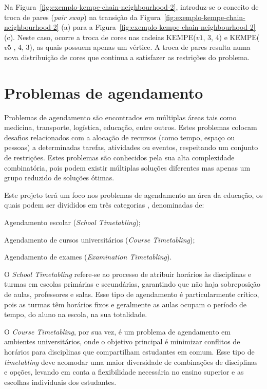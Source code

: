 Na Figura~\ref{fig:exemplo-kempe-chain-neighbourhood-2}, introduz-se o conceito de troca de pares (\textit{pair swap}) na transição da Figura~\ref{fig:exemplo-kempe-chain-neighbourhood-2} (a) para a Figura~\ref{fig:exemplo-kempe-chain-neighbourhood-2} (c). Neste caso, ocorre a troca de cores nas cadeias KEMPE($v1$, 3, 4) e KEMPE($v5$ , 4, 3), as quais possuem apenas um vértice. A troca de pares resulta numa nova distribuição de cores que continua a satisfazer as restrições do problema.

\section{Problemas de agendamento}
\label{capitulo2:Problemas-agendamento}

Problemas de agendamento são encontrados em múltiplas áreas tais como medicina, transporte, logística, educação, entre outros. Estes problemas colocam desafios relacionados com a alocação de recursos (como tempo, espaço ou pessoas) a determinadas tarefas, atividades ou eventos, respeitando um conjunto de restrições. Estes problemas são conhecidos pela sua alta complexidade combinatória, pois podem existir múltiplas soluções diferentes mas apenas um grupo reduzido de soluções ótimas.

Este projeto terá um foco nos problemas de agendamento na área da educação, os quais podem ser divididos em três categorias \cite{SurveyAutomatedTimetabling-Schaerf-1999}, denominadas de:

\begin{compactitem}
    \item Agendamento escolar (\textit{School Timetabling});
    \item Agendamento de cursos universitários (\textit{Course Timetabling});
    \item Agendamento de exames (\textit{Examination Timetabling}).
\end{compactitem}

O \textit{School Timetabling} refere-se ao processo de atribuir horários às disciplinas e turmas em escolas primárias e secundárias, garantindo que não haja sobreposição de aulas, professores e salas. Esse tipo de agendamento é particularmente crítico, pois as turmas têm horários fixos e geralmente as aulas ocupam o período de tempo, do aluno na escola, na sua totalidade.

O \textit{Course Timetabling}, por sua vez, é um problema de agendamento em ambientes universitários, onde o objetivo principal é minimizar conflitos de horários para disciplinas que compartilham estudantes em comum. Esse tipo de \textit{timetabling} deve acomodar uma maior diversidade de combinações de disciplinas e opções, levando em conta a flexibilidade necessária no ensino superior e as escolhas individuais dos estudantes.


